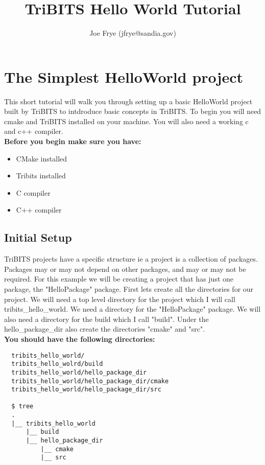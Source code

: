 \documentclass[12pt]{article}
\title{TriBITS Hello World Tutorial}
\author{Joe Frye (jfrye@sandia.gov)}
\begin{document}
\maketitle

\section*{The Simplest HelloWorld project}

This short tutorial will walk you through setting up a basic
HelloWorld project built by TriBITS to intdroduce basic concepts
in TriBITS.  To begin you will need cmake and TriBITS installed on
your machine.  You will also need a working c and c++ compiler.\\

\textbf{Before you begin make sure you have:}
\begin{itemize}
\item CMake installed
\item Tribits installed 
\item C compiler
\item C++ compiler
\end{itemize}

\subsection*{Initial Setup}

TriBITS projects have a specific structure ie a project is a
collection of packages.  Packages may or may not depend on other
packages, and may or may not be required.  For this example we will be
creating a project that has just one package, the "HelloPackage"
package. First lets create all the directories for our project.  We
will need a top level directory for the project which I will call
tribits\_hello\_world. We need a directory for the "HelloPackage"
package.  We will also need a directory for the build which I call
"build".  Under the hello\_package\_dir also create the directories
"cmake" and "src".\\

\textbf{You should have the following directories:}
\begin{verbatim}
  tribits_hello_world/
  tribits_hello_wolrd/build
  tribits_hello_world/hello_package_dir
  tribits_hello_world/hello_package_dir/cmake
  tribits_hello_world/hello_package_dir/src

  $ tree
  .
  |__ tribits_hello_world
      |__ build
      |__ hello_package_dir
          |__ cmake
          |__ src
\end{verbatim}
\end{document}

